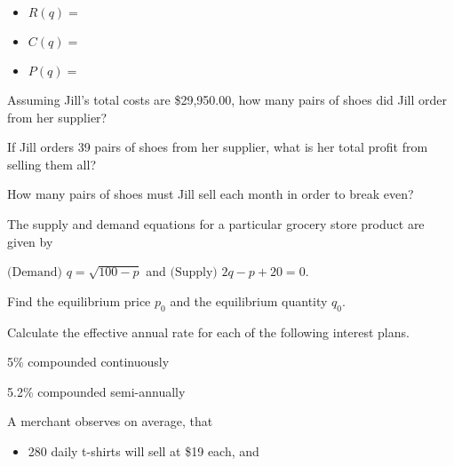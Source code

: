 \documentclass[12pt,legalpaper]{exam}
\newcommand{\smsp}{\vspace{0.25cm}}
\begin{document}
\begin{questions}
\begin{compactenum}[(a)]
\begin{itemize}
\item[] $R(q) =$
\vspace{1.5cm}

\item[] $C(q) =$
\vspace{1.5cm}

\item[] $P(q) =$
\end{itemize}
\vspace{1.5cm} 

\smsp

\item Assuming Jill's total costs are \$29,950.00, how many pairs of shoes did Jill order from her supplier?
\vfill

\item If Jill orders 39 pairs of shoes from her supplier, what is her total profit from selling them all?
\vfill

\item How many pairs of shoes must Jill sell each month in order to break even?
\vfill
\end{compactenum}
\newpage

\question[4] The supply and demand equations for a particular grocery store product are given by
\begin{center}
$\text{(Demand) }q = \sqrt{100 - p}$ and $\text{(Supply) }2q - p + 20 = 0$.
\end{center}
Find the equilibrium price $p_{0}$ and the equilibrium quantity $q_{0}$.
\vspace{15cm}

\question[3] Calculate the effective annual rate for each of the following interest plans.
\begin{compactenum}[(a)]
\item 5\% compounded continuously
\vspace{5cm}

\item 5.2\% compounded semi-annually
\vspace{5cm}
\end{compactenum}
\newpage

\question[5] A merchant observes on average, that
\begin{itemize}
\item 280 daily t-shirts will sell at \$19 each, and
\smsp


\end{itemize}
\end{questions}
\end{document}
